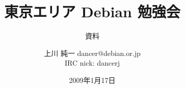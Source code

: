 




\documentclass[cjk,dvipdfmx,12pt]{beamer}
\usepackage[english]{babel}
\usepackage{monthlypresentation}



\title{東京エリア Debian 勉強会}
\subtitle{資料}
\author{上川 純一 dancer@debian.or.jp\\IRC nick: dancerj}
\date{2009年1月17日}


